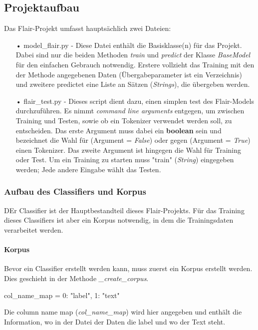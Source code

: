 \documentclass[10pt,a4paper]{article}
\begin{document}
\subsection{Projektaufbau}
Das Flair-Projekt umfasst hauptsächlich zwei Dateien:
\begin{itemize}
\item[•] model\_flair.py - Diese Datei enthält die Basisklasse(n) für das Projekt. Dabei sind nur die beiden Methoden \textit{train} und \textit{predict} der Klasse \textit{BaseModel} für den einfachen Gebrauch notwendig. Erstere vollzieht das Training mit den der Methode angegebenen Daten (Übergabeparameter ist ein Verzeichnis) und zweitere predictet eine Liste an Sätzen (\textit{Strings}), die übergeben werden.
\item[•] flair\_test.py - Dieses script dient dazu, einen simplen test des Flair-Models durchzuführen. Es nimmt \textit{command line arguments} entgegen, um zwischen Training und Testen, sowie ob ein Tokenizer verwendet werden soll, zu entscheiden. Das erste Argument muss dabei ein \textbf{boolean} sein und bezeichnet die Wahl für (Argument = \textit{False}) oder gegen (Argument = \textit{True}) einen Tokenizer. Das zweite Argument ist hingegen die Wahl für Training oder Test. Um ein Training zu starten muss "train" (\textit{String}) eingegeben werden; Jede andere Eingabe wählt das Testen.
\end{itemize}

\subsubsection{Aufbau des Classifiers und Korpus}
DEr Classifier ist der Hauptbestandteil dieses Flair-Projekts. Für das Training dieses Classifiers ist aber ein Korpus notwendig, in dem die Trainingsdaten verarbeitet werden.

\paragraph{Korpus}
Bevor ein Classifier erstellt werden kann, muss zuerst ein Korpus erstellt werden. Dies geschieht in der Methode \textit{\_create\_corpus}.

\begin{python}
col_name_map = {0: "label", 1: "text"}
\end{python}

Die column name map (\textit{col\_name\_map}) wird hier angegeben und enthält die Information, wo in der Datei der Daten die label und wo der Text steht.
\end{document}
